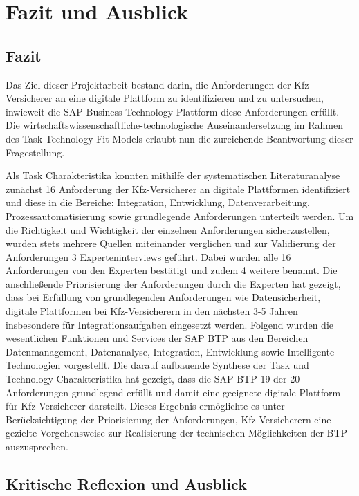 \chapter{Fazit und Ausblick}

\section{Fazit}

Das Ziel dieser Projektarbeit bestand darin, die Anforderungen der Kfz-Versicherer an eine digitale Plattform zu identifizieren und zu untersuchen, inwieweit die SAP Business Technology Plattform diese Anforderungen erfüllt. Die wirtschaftswissenschaftliche-technologische Auseinandersetzung im Rahmen des Task-Technology-Fit-Models erlaubt nun die zureichende Beantwortung dieser Fragestellung. 

Als Task Charakteristika konnten mithilfe der systematischen Literaturanalyse zunächst 16 Anforderung der Kfz-Versicherer an digitale Plattformen identifiziert und diese in die Bereiche: Integration, Entwicklung, Datenverarbeitung, Prozessautomatisierung sowie grundlegende Anforderungen unterteilt werden. Um die Richtigkeit und Wichtigkeit der einzelnen Anforderungen sicherzustellen, wurden stets mehrere Quellen miteinander verglichen und zur Validierung der Anforderungen 3 Experteninterviews geführt. Dabei wurden alle 16 Anforderungen von den Experten bestätigt und zudem 4 weitere benannt. Die anschließende Priorisierung der Anforderungen durch die Experten hat gezeigt, dass bei Erfüllung von grundlegenden Anforderungen wie Datensicherheit, digitale Plattformen bei Kfz-Versicherern in den nächsten 3-5 Jahren insbesondere für Integrationsaufgaben eingesetzt werden. Folgend wurden die wesentlichen Funktionen und Services der SAP BTP aus den Bereichen Datenmanagement, Datenanalyse, Integration, Entwicklung sowie Intelligente Technologien vorgestellt. Die darauf aufbauende Synthese der Task und Technology Charakteristika hat gezeigt, dass die SAP BTP 19 der 20 Anforderungen grundlegend erfüllt und damit eine geeignete digitale Plattform für Kfz-Versicherer darstellt. Dieses Ergebnis ermöglichte es unter Berücksichtigung der Priorisierung der Anforderungen, Kfz-Versicherern eine gezielte Vorgehensweise zur Realisierung der technischen Möglichkeiten der BTP auszusprechen.

\section{Kritische Reflexion und Ausblick}

